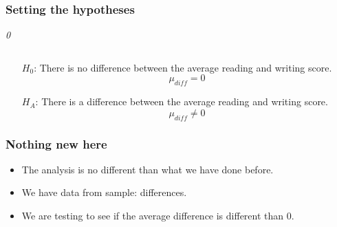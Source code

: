 \documentclass[slidestop,compress,mathserif]{beamer}
\newcommand{\soln}[1]{\textit{#1}}
\begin{document}
\begin{frame}
\frametitle{Setting the hypotheses}


\pause

\soln{0}

$\:$ \\

\pause


\pause

\begin{itemize}
\item[$H_0$:] There is no difference between the average reading and writing score. 
\[ \mu_{diff} = 0 \]
\item[$H_A$:] There is a difference between the average reading and writing score. 
\[ \mu_{diff} \ne 0 \]
\end{itemize}

\end{frame}


\begin{frame}
\frametitle{Nothing new here}

\begin{itemize}

\item The analysis is no different than what we have done before.

\item We have data from  sample: differences. 

\item We are testing to see if the average difference is different than 0.

\end{itemize}

\end{frame}

\end{document}
